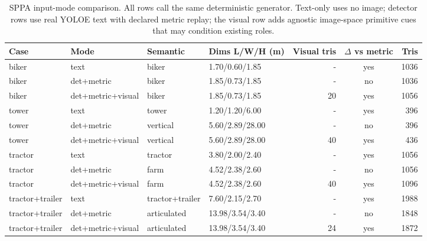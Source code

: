 \begin{table}[H]
\centering
\tiny
\setlength{\tabcolsep}{2pt}
\renewcommand{\arraystretch}{1.06}
\caption{SPPA input-mode comparison. All rows call the same deterministic generator. Text-only uses no image; detector rows use real YOLOE text with declared metric replay; the visual row adds agnostic image-space primitive cues that may condition existing roles.}
\label{tab:sppa-input-mode-comparison}
\begin{tabular}{@{}llllrcr@{}}
\toprule
Case & Mode & Semantic & Dims L/W/H (m) & Visual tris & $\Delta$ vs metric & Tris \\
\midrule
biker & text & biker & 1.70/0.60/1.85 & - & yes & 1036 \\
biker & det+metric & biker & 1.85/0.73/1.85 & - & no & 1036 \\
biker & det+metric+visual & biker & 1.85/0.73/1.85 & 20 & yes & 1056 \\
tower & text & tower & 1.20/1.20/6.00 & - & yes & 396 \\
tower & det+metric & vertical & 5.60/2.89/28.00 & - & no & 396 \\
tower & det+metric+visual & vertical & 5.60/2.89/28.00 & 40 & yes & 436 \\
tractor & text & tractor & 3.80/2.00/2.40 & - & yes & 1056 \\
tractor & det+metric & farm & 4.52/2.38/2.60 & - & no & 1056 \\
tractor & det+metric+visual & farm & 4.52/2.38/2.60 & 40 & yes & 1096 \\
tractor+trailer & text & tractor+trailer & 7.60/2.15/2.70 & - & yes & 1988 \\
tractor+trailer & det+metric & articulated & 13.98/3.54/3.40 & - & no & 1848 \\
tractor+trailer & det+metric+visual & articulated & 13.98/3.54/3.40 & 24 & yes & 1872 \\
\bottomrule
\end{tabular}
\end{table}
